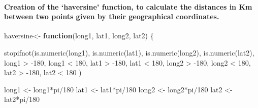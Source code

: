 \documentclass[
]{article}
\newenvironment{Shaded}{\begin{snugshade}}{\end{snugshade}}
\newcommand{\ControlFlowTok}[1]{\textcolor[rgb]{0.13,0.29,0.53}{\textbf{#1}}}
\newcommand{\DecValTok}[1]{\textcolor[rgb]{0.00,0.00,0.81}{#1}}
\newcommand{\FunctionTok}[1]{\textcolor[rgb]{0.00,0.00,0.00}{#1}}
\newcommand{\NormalTok}[1]{#1}
\newcommand{\OtherTok}[1]{\textcolor[rgb]{0.56,0.35,0.01}{#1}}
\newcommand{\SpecialCharTok}[1]{\textcolor[rgb]{0.00,0.00,0.00}{#1}}
\begin{document}
\hypertarget{creation-of-the-haversine-function-to-calculate-the-distances-in-km-between-two-points-given-by-their-geographical-coordinates.}{%
\paragraph{Creation of the `haversine' function, to calculate the
distances in Km between two points given by their geographical
coordinates.}\label{creation-of-the-haversine-function-to-calculate-the-distances-in-km-between-two-points-given-by-their-geographical-coordinates.}}

\begin{Shaded}
\begin{Highlighting}[]
\NormalTok{haversine}\OtherTok{\textless{}{-}} \ControlFlowTok{function}\NormalTok{(long1, lat1, long2, lat2) \{}
  
  \FunctionTok{stopifnot}\NormalTok{(}\FunctionTok{is.numeric}\NormalTok{(long1),}
            \FunctionTok{is.numeric}\NormalTok{(lat1),}
            \FunctionTok{is.numeric}\NormalTok{(long2),}
            \FunctionTok{is.numeric}\NormalTok{(lat2),}
\NormalTok{            long1 }\SpecialCharTok{\textgreater{}} \SpecialCharTok{{-}}\DecValTok{180}\NormalTok{,}
\NormalTok{            long1 }\SpecialCharTok{\textless{}} \DecValTok{180}\NormalTok{,}
\NormalTok{            lat1 }\SpecialCharTok{\textgreater{}} \SpecialCharTok{{-}}\DecValTok{180}\NormalTok{,}
\NormalTok{            lat1 }\SpecialCharTok{\textless{}} \DecValTok{180}\NormalTok{,}
\NormalTok{            long2 }\SpecialCharTok{\textgreater{}} \SpecialCharTok{{-}}\DecValTok{180}\NormalTok{,}
\NormalTok{            long2 }\SpecialCharTok{\textless{}} \DecValTok{180}\NormalTok{,}
\NormalTok{            lat2 }\SpecialCharTok{\textgreater{}} \SpecialCharTok{{-}}\DecValTok{180}\NormalTok{,}
\NormalTok{            lat2 }\SpecialCharTok{\textless{}} \DecValTok{180}
\NormalTok{  )}
  
\NormalTok{  long1 }\OtherTok{\textless{}{-}}\NormalTok{ long1}\SpecialCharTok{*}\NormalTok{pi}\SpecialCharTok{/}\DecValTok{180}
\NormalTok{  lat1 }\OtherTok{\textless{}{-}}\NormalTok{ lat1}\SpecialCharTok{*}\NormalTok{pi}\SpecialCharTok{/}\DecValTok{180}
\NormalTok{  long2 }\OtherTok{\textless{}{-}}\NormalTok{ long2}\SpecialCharTok{*}\NormalTok{pi}\SpecialCharTok{/}\DecValTok{180}
\NormalTok{  lat2 }\OtherTok{\textless{}{-}}\NormalTok{ lat2}\SpecialCharTok{*}\NormalTok{pi}\SpecialCharTok{/}\DecValTok{180}
  

\end{Highlighting}
\end{Shaded}
\end{document}
